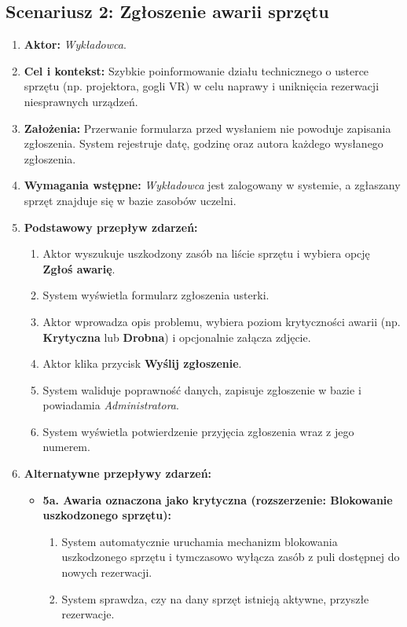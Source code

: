\documentclass[11pt, a4paper]{article}
\begin{document}
\subsection{Scenariusz 2: Zgłoszenie awarii sprzętu}
\begin{enumerate}
    \item \textbf{Aktor:} \textit{Wykładowca}.
    \item \textbf{Cel i kontekst:} Szybkie poinformowanie działu technicznego o usterce sprzętu (np. projektora, gogli VR) w celu naprawy i uniknięcia rezerwacji niesprawnych urządzeń.
    \item \textbf{Założenia:} Przerwanie formularza przed wysłaniem nie powoduje zapisania zgłoszenia. System rejestruje datę, godzinę oraz autora każdego wysłanego zgłoszenia.
    \item \textbf{Wymagania wstępne:} \textit{Wykładowca} jest zalogowany w systemie, a zgłaszany sprzęt znajduje się w bazie zasobów uczelni.
    \item \textbf{Podstawowy przepływ zdarzeń:}
    \begin{enumerate}
        \item Aktor wyszukuje uszkodzony zasób na liście sprzętu i wybiera opcję \textbf{Zgłoś awarię}.
        \item System wyświetla formularz zgłoszenia usterki.
        \item Aktor wprowadza opis problemu, wybiera poziom krytyczności awarii (np. \textbf{Krytyczna} lub \textbf{Drobna}) i opcjonalnie załącza zdjęcie.
        \item Aktor klika przycisk \textbf{Wyślij zgłoszenie}.
        \item System waliduje poprawność danych, zapisuje zgłoszenie w bazie i powiadamia \textit{Administratora}.
        \item System wyświetla potwierdzenie przyjęcia zgłoszenia wraz z jego numerem.
    \end{enumerate}
    \item \textbf{Alternatywne przepływy zdarzeń:}
    \begin{itemize}
        \item \textbf{5a. Awaria oznaczona jako krytyczna (rozszerzenie: Blokowanie uszkodzonego sprzętu):}
        \begin{enumerate}
            \item System automatycznie uruchamia mechanizm blokowania uszkodzonego sprzętu i tymczasowo wyłącza zasób z puli dostępnej do nowych rezerwacji.
            \item System sprawdza, czy na dany sprzęt istnieją aktywne, przyszłe rezerwacje.

\end{enumerate}
\end{itemize}
\end{enumerate}
\end{document}
